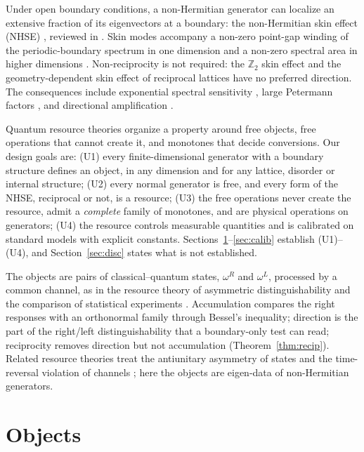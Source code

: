 \documentclass[11pt]{article}
\theoremstyle{definition}
\theoremstyle{remark}
\begin{document}
Under open boundary conditions, a non-Hermitian generator can localize an extensive fraction of its eigenvectors at a boundary: the non-Hermitian skin effect (NHSE) \cite{HN96,YW18,KEBB18,LT19,YM19,OKSS20,ZYF20,ZYF22}, reviewed in \cite{AGU20,BBK21}. Skin modes accompany a non-zero point-gap winding of the periodic-boundary spectrum in one dimension \cite{OKSS20,ZYF20} and a non-zero spectral area in higher dimensions \cite{ZYF22}. Non-reciprocity is not required: the $\mathbb Z_2$ skin effect \cite{OKSS20} and the geometry-dependent skin effect of reciprocal lattices \cite{ZYF22,WHWMD23} have no preferred direction. The consequences include exponential spectral sensitivity \cite{TE05,BB20}, large Petermann factors \cite{Pet79}, and directional amplification \cite{Por19,WBN20}.

Quantum resource theories \cite{CG19,CFS16} organize a property around free objects, free operations that cannot create it, and monotones that decide conversions. Our design goals are: (U1) every finite-dimensional generator with a boundary structure defines an object, in any dimension and for any lattice, disorder or internal structure; (U2) every normal generator is free, and every form of the NHSE, reciprocal or not, is a resource; (U3) the free operations never create the resource, admit a \emph{complete} family of monotones, and are physical operations on generators; (U4) the resource controls measurable quantities and is calibrated on standard models with explicit constants. Sections~\ref{sec:objects}--\ref{sec:calib} establish (U1)--(U4), and Section~\ref{sec:disc} states what is not established.

The objects are pairs of classical--quantum states, $\omega^R$ and $\omega^L$, processed by a common channel, as in the resource theory of asymmetric distinguishability \cite{WW19} and the comparison of statistical experiments \cite{Bla53,Bus12}. Accumulation compares the right responses with an orthonormal family through Bessel's inequality; direction is the part of the right/left distinguishability that a boundary-only test can read; reciprocity removes direction but not accumulation (Theorem~\ref{thm:recip}). Related resource theories treat the antiunitary asymmetry of states \cite{BFPW16} and the time-reversal violation of channels \cite{MKM26}; here the objects are eigen-data of non-Hermitian generators.

\section{Objects}
\label{sec:objects}
\end{document}
